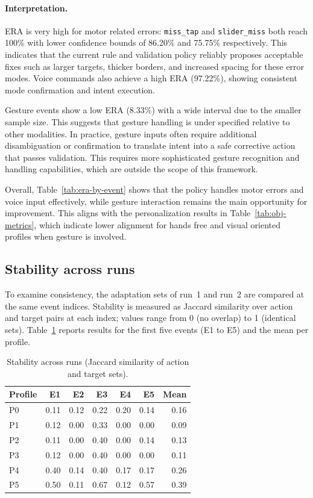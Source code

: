 \paragraph{Interpretation.}
ERA is very high for motor related errors: \texttt{miss\_tap} and \texttt{slider\_miss} both reach 100\% with lower confidence bounds of 86.20\% and 75.75\% respectively. This indicates that the current rule and validation policy reliably proposes acceptable fixes such as larger targets, thicker borders, and increased spacing for these error modes. Voice commands also achieve a high ERA (97.22\%), showing consistent mode confirmation and intent execution.

Gesture events show a low ERA (8.33\%) with a wide interval due to the smaller sample size. This suggests that gesture handling is under specified relative to other modalities. In practice, gesture inputs often require additional disambiguation or confirmation to translate intent into a safe corrective action that passes validation. This requires more sophisticated gesture recognition and handling capabilities, which are outside the scope of this framework.

Overall, Table~\ref{tab:era-by-event} shows that the policy handles motor errors and voice input effectively, while gesture interaction remains the main opportunity for improvement. This aligns with the personalization results in Table~\ref{tab:obj-metrics}, which indicate lower alignment for hands free and visual oriented profiles when gesture is involved.

\subsection{Stability across runs}
\label{sec:stability-runs}
To examine consistency, the adaptation sets of run~1 and run~2 are compared at the same event indices. Stability is measured as Jaccard similarity over action and target pairs at each index; values range from 0 (no overlap) to 1 (identical sets). Table~\ref{tab:stability} reports results for the first five events (E1 to E5) and the mean per profile.

\begin{table}[H]
\centering
\caption{Stability across runs (Jaccard similarity of action and target sets).}
\label{tab:stability}
\begin{tabular}{lrrrrrr}
\toprule
\textbf{Profile} & \textbf{E1} & \textbf{E2} & \textbf{E3} & \textbf{E4} & \textbf{E5} & \textbf{Mean} \\
\midrule
P0 & 0.11 & 0.12 & 0.22 & 0.20 & 0.14 & 0.16 \\
P1 & 0.12 & 0.00 & 0.33 & 0.00 & 0.00 & 0.09 \\
P2 & 0.11 & 0.00 & 0.40 & 0.00 & 0.14 & 0.13 \\
P3 & 0.12 & 0.00 & 0.40 & 0.00 & 0.00 & 0.11 \\
P4 & 0.40 & 0.14 & 0.40 & 0.17 & 0.17 & 0.26 \\
P5 & 0.50 & 0.11 & 0.67 & 0.12 & 0.57 & 0.39 \\
\bottomrule
\end{tabular}
\end{table}


